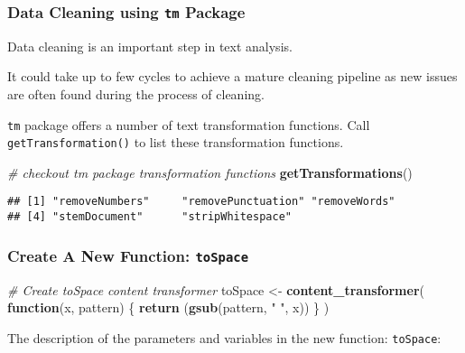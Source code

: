 \documentclass[
]{article}
\newenvironment{Shaded}{\begin{snugshade}}{\end{snugshade}}
\newcommand{\CommentTok}[1]{\textcolor[rgb]{0.56,0.35,0.01}{\textit{#1}}}
\newcommand{\ControlFlowTok}[1]{\textcolor[rgb]{0.13,0.29,0.53}{\textbf{#1}}}
\newcommand{\KeywordTok}[1]{\textcolor[rgb]{0.13,0.29,0.53}{\textbf{#1}}}
\newcommand{\NormalTok}[1]{#1}
\newcommand{\StringTok}[1]{\textcolor[rgb]{0.31,0.60,0.02}{#1}}
\begin{document}
\hypertarget{data-cleaning-using-tm-package}{%
\subsubsection{\texorpdfstring{Data Cleaning using \texttt{tm}
Package}{Data Cleaning using tm Package}}\label{data-cleaning-using-tm-package}}

Data cleaning is an important step in text analysis.

It could take up to few cycles to achieve a mature cleaning pipeline as
new issues are often found during the process of cleaning.

\texttt{tm} package offers a number of text transformation functions.
Call \texttt{getTransformation()} to list these transformation
functions.

\begin{Shaded}
\begin{Highlighting}[]
\CommentTok{# checkout tm package transformation functions}
\KeywordTok{getTransformations}\NormalTok{()}
\end{Highlighting}
\end{Shaded}

\begin{verbatim}
## [1] "removeNumbers"     "removePunctuation" "removeWords"      
## [4] "stemDocument"      "stripWhitespace"
\end{verbatim}

\hypertarget{create-a-new-function-tospace}{%
\subsubsection{\texorpdfstring{Create A New Function:
\texttt{toSpace}}{Create A New Function: toSpace}}\label{create-a-new-function-tospace}}

\begin{Shaded}
\begin{Highlighting}[]
\CommentTok{# Create toSpace content transformer}
\NormalTok{toSpace <-}\StringTok{ }\KeywordTok{content_transformer}\NormalTok{(}
  \ControlFlowTok{function}\NormalTok{(x, pattern) \{}
    \KeywordTok{return}\NormalTok{ (}\KeywordTok{gsub}\NormalTok{(pattern, }\StringTok{" "}\NormalTok{, x))}
\NormalTok{  \}}
\NormalTok{)}
\end{Highlighting}
\end{Shaded}

The description of the parameters and variables in the new function:
\texttt{toSpace}:
\end{document}
